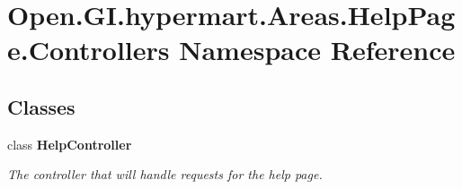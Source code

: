 \section{Open.\+G\+I.\+hypermart.\+Areas.\+Help\+Page.\+Controllers Namespace Reference}
\label{namespace_open_1_1_g_i_1_1hypermart_1_1_areas_1_1_help_page_1_1_controllers}
\subsection*{Classes}
\begin{DoxyCompactItemize}
\item 
class \textbf{ Help\+Controller}
\begin{DoxyCompactList}\small\item\em The controller that will handle requests for the help page. \end{DoxyCompactList}\end{DoxyCompactItemize}
